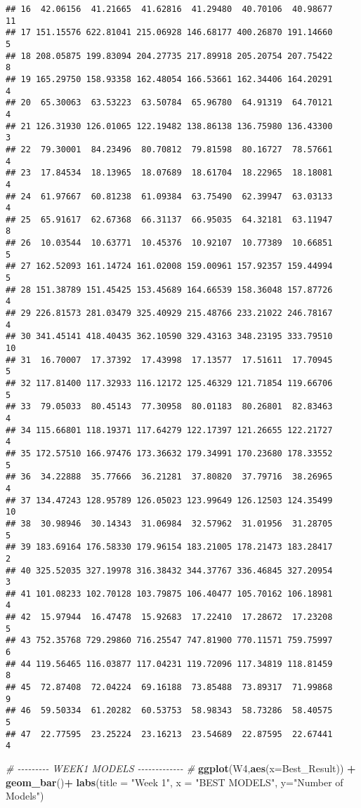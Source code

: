 \documentclass[
]{article}
\newenvironment{Shaded}{\begin{snugshade}}{\end{snugshade}}
\newcommand{\AttributeTok}[1]{\textcolor[rgb]{0.13,0.29,0.53}{#1}}
\newcommand{\CommentTok}[1]{\textcolor[rgb]{0.56,0.35,0.01}{\textit{#1}}}
\newcommand{\FunctionTok}[1]{\textcolor[rgb]{0.13,0.29,0.53}{\textbf{#1}}}
\newcommand{\NormalTok}[1]{#1}
\newcommand{\SpecialCharTok}[1]{\textcolor[rgb]{0.81,0.36,0.00}{\textbf{#1}}}
\newcommand{\StringTok}[1]{\textcolor[rgb]{0.31,0.60,0.02}{#1}}
\begin{document}
\begin{verbatim}
## 16  42.06156  41.21665  41.62816  41.29480  40.70106  40.98677          11
## 17 151.15576 622.81041 215.06928 146.68177 400.26870 191.14660           5
## 18 208.05875 199.83094 204.27735 217.89918 205.20754 207.75422           8
## 19 165.29750 158.93358 162.48054 166.53661 162.34406 164.20291           4
## 20  65.30063  63.53223  63.50784  65.96780  64.91319  64.70121           4
## 21 126.31930 126.01065 122.19482 138.86138 136.75980 136.43300           3
## 22  79.30001  84.23496  80.70812  79.81598  80.16727  78.57661           4
## 23  17.84534  18.13965  18.07689  18.61704  18.22965  18.18081           4
## 24  61.97667  60.81238  61.09384  63.75490  62.39947  63.03133           4
## 25  65.91617  62.67368  66.31137  66.95035  64.32181  63.11947           8
## 26  10.03544  10.63771  10.45376  10.92107  10.77389  10.66851           5
## 27 162.52093 161.14724 161.02008 159.00961 157.92357 159.44994           5
## 28 151.38789 151.45425 153.45689 164.66539 158.36048 157.87726           4
## 29 226.81573 281.03479 325.40929 215.48766 233.21022 246.78167           4
## 30 341.45141 418.40435 362.10590 329.43163 348.23195 333.79510          10
## 31  16.70007  17.37392  17.43998  17.13577  17.51611  17.70945           5
## 32 117.81400 117.32933 116.12172 125.46329 121.71854 119.66706           5
## 33  79.05033  80.45143  77.30958  80.01183  80.26801  82.83463           4
## 34 115.66801 118.19371 117.64279 122.17397 121.26655 122.21727           4
## 35 172.57510 166.97476 173.36632 179.34991 170.23680 178.33552           5
## 36  34.22888  35.77666  36.21281  37.80820  37.79716  38.26965           4
## 37 134.47243 128.95789 126.05023 123.99649 126.12503 124.35499          10
## 38  30.98946  30.14343  31.06984  32.57962  31.01956  31.28705           5
## 39 183.69164 176.58330 179.96154 183.21005 178.21473 183.28417           2
## 40 325.52035 327.19978 316.38432 344.37767 336.46845 327.20954           3
## 41 101.08233 102.70128 103.79875 106.40477 105.70162 106.18981           4
## 42  15.97944  16.47478  15.92683  17.22410  17.28672  17.23208           5
## 43 752.35768 729.29860 716.25547 747.81900 770.11571 759.75997           6
## 44 119.56465 116.03877 117.04231 119.72096 117.34819 118.81459           8
## 45  72.87408  72.04224  69.16188  73.85488  73.89317  71.99868           9
## 46  59.50334  61.20282  60.53753  58.98343  58.73286  58.40575           5
## 47  22.77595  23.25224  23.16213  23.54689  22.87595  22.67441           4
\end{verbatim}

\begin{Shaded}
\begin{Highlighting}[]
\CommentTok{\# {-}{-}{-}{-}{-}{-}{-}{-}{-} WEEK1 MODELS {-}{-}{-}{-}{-}{-}{-}{-}{-}{-}{-}{-}{-} \#}
\FunctionTok{ggplot}\NormalTok{(W4,}\FunctionTok{aes}\NormalTok{(}\AttributeTok{x=}\NormalTok{Best\_Result)) }\SpecialCharTok{+} \FunctionTok{geom\_bar}\NormalTok{()}\SpecialCharTok{+}
  \FunctionTok{labs}\NormalTok{(}\AttributeTok{title =} \StringTok{"Week 1"}\NormalTok{,}
       \AttributeTok{x =} \StringTok{"BEST MODELS"}\NormalTok{, }\AttributeTok{y=}\StringTok{"Number of Models"}\NormalTok{) }
\end{Highlighting}
\end{Shaded}
\end{document}
